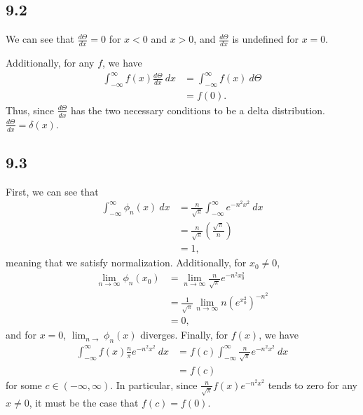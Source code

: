 \documentclass[10pt]{mypackage}
\begin{document}
\subsection{9.2}%
We can see that $\frac{d\Theta}{dx} = 0$ for $x < 0$ and $x > 0$, and $\frac{d\Theta}{dx}$ is undefined for $x = 0$.\newline

Additionally, for any $f$, we have
\begin{align*}
  \int_{-\infty}^{\infty} f(x)\frac{d\Theta}{dx}\:dx &= \int_{-\infty}^{\infty} f(x)\:d\Theta\\
                                                     &= f(0).
\end{align*}
Thus, since $\frac{d\Theta}{dx}$ has the two necessary conditions to be a delta distribution. $\frac{d\Theta}{dx } = \delta(x)$.

\subsection{9.3}%
First, we can see that
\begin{align*}
  \int_{-\infty}^{\infty} \phi_n(x)\:dx &= \frac{n}{\sqrt{\pi}}\int_{-\infty}^{\infty} e^{-n^2x^2}\:dx\\
                                        &= \frac{n}{\sqrt{\pi}}\left(\frac{\sqrt{\pi}}{n}\right)\\
                                        &= 1,
\end{align*}
meaning that we satisfy normalization. Additionally, for $x_0\neq 0$,
\begin{align*}
  \lim_{n\rightarrow\infty} \phi_n\left(x_0\right) &= \lim_{n\rightarrow\infty}\frac{n}{\sqrt{\pi}}e^{-n^2x_0^2}\\
                                                   &= \frac{1}{\sqrt{\pi}}\lim_{n\rightarrow\infty}n\left(e^{x_0^2}\right)^{-n^2}\\
                                                   &= 0,
\end{align*}
and for $x = 0$, $\lim_{n\rightarrow}\phi_n(x)$ diverges. Finally, for $f(x)$, we have
\begin{align*}
  \int_{-\infty}^{\infty} f(x)\frac{n}{\pi}e^{-n^2x^2}\:dx &= f(c)\int_{-\infty}^{\infty}\frac{n}{\sqrt{\pi}}e^{-n^2x^2}\:dx\\
                                                           &= f(c)
\end{align*}
for some $c\in (-\infty,\infty)$. In particular, since $\frac{n}{\sqrt{\pi}}f(x)e^{-n^2x^2}$ tends to zero for any $x\neq 0$, it must be the case that $f(c) = f(0)$.
\end{document}
